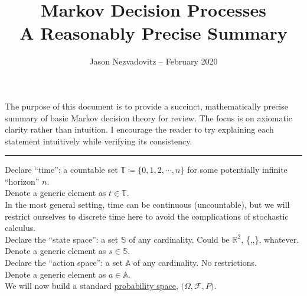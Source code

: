 





\title{\textbf{Markov Decision Processes}\\ \large{A Reasonably Precise Summary}\vspace{-6ex}}
\author{\vspace{-5ex}}
\date{\small{Jason Nezvadovitz -- February 2020}}
\maketitle


The purpose of this document is to provide a succinct, mathematically precise summary of basic Markov decision theory for review. The focus is on axiomatic clarity rather than intuition. I encourage the reader to try explaining each statement intuitively while verifying its consistency.

\vspace{0.2in}
\hrule
\vspace{0.2in}

Declare ``time'': a countable set $\mathbb{T} \coloneqq \{0, 1, 2, \cdots, n\}$ for some potentially infinite ``horizon'' $n$.\\
Denote a generic element as $t \in \mathbb{T}$.\\

In the most general setting, time can be continuous (uncountable), but we will restrict ourselves to discrete time here to avoid the complications of stochastic calculus.\\

Declare the ``state space'': a set $\mathbb{S}$ of any cardinality. Could be $\mathbb{R}^2$, \{\Smiley,\Cooley,\Winkey\}, whatever.\\
Denote a generic element as $s \in \mathbb{S}$.\\

Declare the ``action space'': a set $\mathbb{A}$ of any cardinality. No restrictions.\\
Denote a generic element as $a \in \mathbb{A}$.\\

We will now build a standard \href{https://en.wikipedia.org/wiki/Probability_space}{probability space}, $\boldsymbol{(}\Omega, \mathcal{F}, P\boldsymbol{)}$.\\

